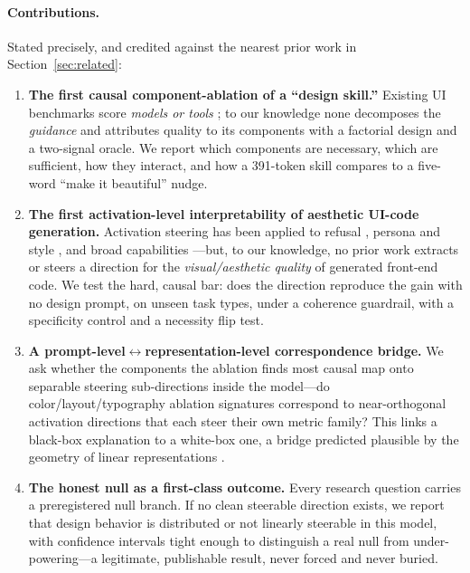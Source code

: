 \paragraph{Contributions.} Stated precisely, and credited against the nearest prior work in
Section~\ref{sec:related}:
\begin{enumerate}[leftmargin=1.4em,itemsep=2pt,topsep=2pt]
\item \textbf{The first causal component-ablation of a ``design skill.''} Existing UI
benchmarks score \emph{models or tools}
\citep{si2024design2code,zhang2025artifactsbench,xiao2025designbench}; to our knowledge none
decomposes the \emph{guidance} and attributes quality to its components with a factorial design
and a two-signal oracle. We report which components are necessary, which are sufficient, how
they interact, and how a 391-token skill compares to a five-word ``make it beautiful'' nudge.
\item \textbf{The first activation-level interpretability of aesthetic UI-code generation.}
Activation steering has been applied to refusal \citep{arditi2024refusal}, persona and style
\citep{chen2025persona,konen2024style}, and broad capabilities
\citep{vanderweij2024broad}---but, to our knowledge, no prior work extracts or steers a
direction for the \emph{visual/aesthetic quality} of generated front-end code. We test the
hard, causal bar: does the direction reproduce the gain with no design prompt, on unseen task
types, under a coherence guardrail, with a specificity control and a necessity flip test.
\item \textbf{A prompt-level$\leftrightarrow$representation-level correspondence bridge.} We ask
whether the components the ablation finds most causal map onto separable steering
sub-directions inside the model---do color/layout/typography ablation signatures correspond to
near-orthogonal activation directions that each steer their own metric family? This links a
black-box explanation to a white-box one, a bridge predicted plausible by the geometry of
linear representations \citep{park2024geometry}.
\item \textbf{The honest null as a first-class outcome.} Every research question carries a
preregistered null branch. If no clean steerable direction exists, we report that design
behavior is distributed or not linearly steerable in this model, with confidence intervals
tight enough to distinguish a real null from under-powering---a legitimate, publishable result,
never forced and never buried.
\end{enumerate}

